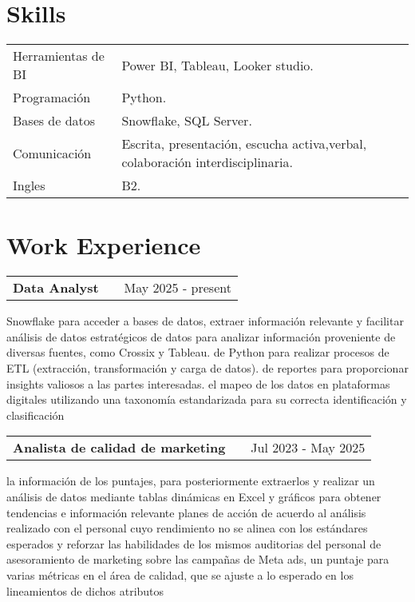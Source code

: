 \documentclass[a4paper,12pt]{article}
\makeatletter
\newenvironment{jobshort}[2]
    {
    \begin{tabularx}{\linewidth}{@{}l X r@{}}
    \textbf{#1} & \hfill &  #2 \\[3.75pt]
    \end{tabularx}
    }
    {
    }
\makeatother
\begin{document}
\section{Skills}
\begin{tabularx}{\linewidth}{@{}l X@{}}
Herramientas de BI &  \normalsize{Power BI, Tableau, Looker studio.}\\
Programación &  \normalsize{Python.}\\
Bases de datos &  \normalsize{Snowflake, SQL Server.}\\
Comunicación &  \normalsize{Escrita, presentación, escucha activa,verbal, colaboración interdisciplinaria.}\\
Ingles  &  \normalsize{B2.}\\  
\end{tabularx}

\section{Work Experience}

\begin{jobshort}{Data Analyst}{May 2025 - present}
\Utilizar Snowflake para acceder a bases de datos, extraer información relevante y facilitar análisis de datos estratégicos
 de datos para analizar información proveniente de diversas fuentes, como Crossix y Tableau.
\Uso de Python para realizar procesos de ETL (extracción, transformación y carga de datos).
 de reportes para proporcionar insights valiosos a las partes interesadas.
\Realizar el mapeo de los datos en plataformas digitales utilizando una taxonomía estandarizada para su correcta identificación y clasificación
\end{jobshort}

\begin{jobshort}{Analista de calidad de marketing}{Jul 2023 - May 2025}
\Recolectar la información de los puntajes, para posteriormente extraerlos y realizar un análisis de datos
mediante tablas dinámicas en Excel y gráficos para obtener tendencias e información relevante
\Realizar planes de acción de acuerdo al análisis realizado con el personal cuyo rendimiento no se alinea con
los estándares esperados y reforzar las habilidades de los mismos
\Realizar auditorias del personal de asesoramiento de marketing sobre las campañas de Meta ads,
\Asignar un puntaje para varias métricas en el área de calidad, que se ajuste a lo esperado en los lineamientos
de dichos atributos
\end{jobshort}
\end{document}
